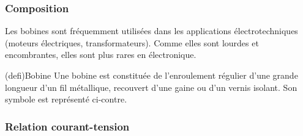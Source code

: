\documentclass[../../main/main.tex]{subfiles}
\begin{document}
\subsubsection{Composition}

Les bobines sont fréquemment utilisées dans les applications électrotechniques
(moteurs électriques, transformateurs). Comme elles sont lourdes et
encombrantes, elles sont plus rares en électronique.

\begin{tcb}[label=def:bobine, sidebyside, righthand ratio=.3](defi){Bobine}
	Une bobine est constituée de l'enroulement régulier d'une grande
	longueur d'un fil métallique, recouvert d'une gaine ou d'un vernis
	isolant. Son symbole est représenté ci-contre.
	\tcblower
	\begin{center}
	\end{center}
\end{tcb}

\vspace{-15pt}
\subsubsection{Relation courant-tension}
\end{document}
